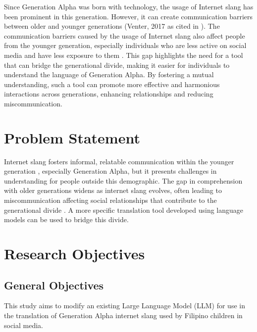 Since Generation Alpha was born with technology, the usage of Internet slang has been prominent in this generation.
However, it can create communication barriers between older and younger generations (Venter, 2017 as cited in \cite{Ghazali_Abdullah_2021}).
The communication barriers caused by the usage of Internet slang also affect people from the younger generation, especially individuals who are less active on social media and have less exposure to them \cite{Vacalares_Salas_Babac_Cagalawan_Calimpong_2023}.
This gap highlights the need for a tool that can bridge the generational divide, making it easier for individuals to understand the language of Generation Alpha.
By fostering a mutual understanding, such a tool can promote more effective and harmonious interactions across generations, enhancing relationships and reducing miscommunication.

\section{Problem Statement}
\label{sec:problem_statement}

Internet slang fosters informal, relatable communication within the younger generation \cite{Ghazali_Abdullah_2021}, especially Generation Alpha, but it presents challenges in understanding for people outside this demographic. 
The gap in comprehension with older generations widens as internet slang evolves, often leading to miscommunication affecting social relationships that contribute to the generational divide \cite{Vacalares_Salas_Babac_Cagalawan_Calimpong_2023}. 
A more specific translation tool developed using language models can be used to bridge this divide.

\section{Research Objectives}
\label{sec:research_objectives}

\subsection{General Objectives}
\label{sec:general_objectives}
This study aims to modify an existing Large Language Model (LLM) for use in the translation of Generation Alpha internet slang used by Filipino children in social media.
